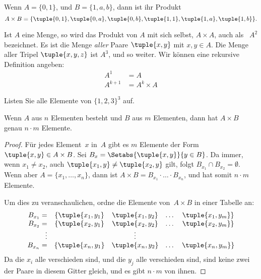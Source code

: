 \documentclass[../../../include/open-logic-section]{subfiles}
\begin{document}
\begin{ex}
Wenn $A = \{0, 1\}$, und $B = \{1, a, b\}$, dann ist ihr Produkt
\[
A \times B = \{ \tuple{0, 1}, \tuple{0, a}, \tuple{0, b},
    \tuple{1, 1}, \tuple{1, a}, \tuple{1, b} \}.
\]
\end{ex}

\begin{ex}
Ist $A$ eine Menge, so wird das Produkt von $A$ mit sich selbst, $A \times A$, auch
als ~$A^2$ bezeichnet. Es ist die Menge \emph{aller} Paare $\tuple{x, y}$ mit
$x, y \in A$. Die Menge aller Tripel $\tuple{x, y, z}$ ist $A^3$,
und so weiter. Wir können eine rekursive Definition angeben:
\begin{align*}
  A^1 & = A\\
  A^{k+1} & = A^k \times A
\end{align*}
\end{ex}

\begin{prob}
Listen Sie alle Elemente von $\{1, 2, 3\}^3$ auf.
\end{prob}

\begin{prop}
Wenn $A$ aus $n$ Elementen besteht und $B$ aus $m$ Elementen, dann hat $A
\times B$ genau $n\cdot m$ Elemente.
\end{prop}

\begin{proof}
Für jedes Element~$x$ in~$A$ gibt es $m$ Elemente der
Form $\tuple{x, y} \in A \times B$. Sei $B_x = \Setabs{\tuple{x, y}}{y
  \in B}$. Da immer, wenn $x_1 \neq x_2$, auch $\tuple{x_1, y} \neq
\tuple{x_2, y}$ gilt, folgt $B_{x_1} \cap B_{x_2} = \emptyset$. Wenn aber $A = \{x_1,
\dots, x_n\}$, dann ist $A \times B = B_{x_1} \cdot \dots \cdot B_{x_n}$, und hat somit
$n\cdot m$ Elemente.

Um dies zu veranschaulichen, ordne die Elemente von~$A \times B$ in einer Tabelle an:
\[
\begin{array}{rcccc}
  B_{x_1} = & \{\tuple{x_1, y_1} & \tuple{x_1, y_2} & \dots & \tuple{x_1, y_m}\} \\
  B_{x_2} = & \{\tuple{x_2, y_1} & \tuple{x_2, y_2} & \dots & \tuple{x_2, y_m}\} \\
  \vdots & & \vdots\\
  B_{x_n} = & \{\tuple{x_n, y_1} & \tuple{x_n, y_2} & \dots & \tuple{x_n, y_m}\} \\
\end{array}
\]
Da die $x_i$ alle verschieden sind, und die $y_j$ alle verschieden sind, sind keine
zwei der Paare in diesem Gitter gleich, und es gibt $n\cdot m$
von ihnen.
\end{proof}
\end{document}
